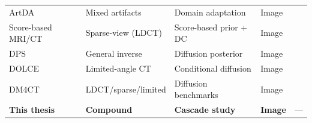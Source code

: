 \begin{table}[!htb]
\begin{tabular}{@{}l l l l c@{}}
        ArtDA         & Mixed artifacts      & Domain adaptation      & Image            & \cite{Liang2025}      \\
        Score-based MRI/CT & Sparse-view (LDCT) & Score-based prior + DC & Image            & \cite{Song2022}       \\
        DPS           & General inverse      & Diffusion posterior    & Image            & \cite{Chung2023}      \\
        DOLCE         & Limited-angle CT     & Conditional diffusion  & Image            & \cite{Liu2023DOLCE}   \\
        DM4CT         & LDCT/sparse/limited  & Diffusion benchmarks   & Image            & \cite{DM4CT2025}      \\
        \midrule
        \textbf{This thesis} & \textbf{Compound} & \textbf{Cascade study} & \textbf{Image} & ---             \\
        \bottomrule
    \end{tabular}
\end{table}
